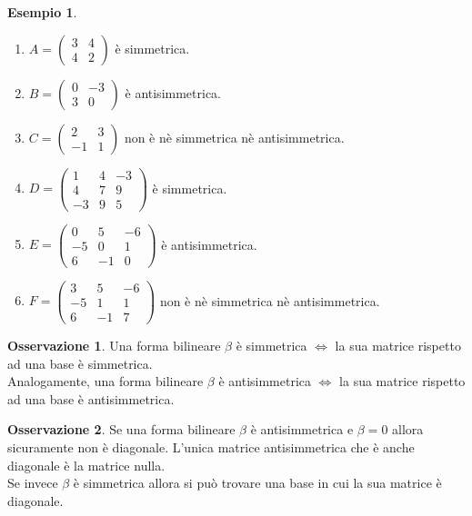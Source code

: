 \documentclass[a4paper]{article}
\theoremstyle{definition}
\newtheorem*{oss}{Osservazione}
\newtheorem*{es}{Esempio}
\begin{document}
	\begin{es}
		\begin{enumerate}
			\item $A = \begin{pmatrix}
				3 & 4 \\
				4 & 2
			\end{pmatrix}$ è simmetrica.
			\item $B = \begin{pmatrix}
				0 & -3 \\
				3 & 0
			\end{pmatrix}$ è antisimmetrica.
			\item $C = \begin{pmatrix}
				2 & 3 \\
				-1 & 1
			\end{pmatrix}$ non è nè simmetrica nè antisimmetrica.
			\item $D = \begin{pmatrix}
				1 & 4 & -3 \\
				4 & 7 & 9 \\
				-3 & 9 & 5
			\end{pmatrix}$ è simmetrica.
			\item $E = \begin{pmatrix}
				0 & 5 & -6 \\
				-5 & 0 & 1 \\
				6 & -1 & 0
			\end{pmatrix}$ è antisimmetrica.
			\item $F = \begin{pmatrix}
				3 & 5 & -6 \\
				-5 & 1 & 1 \\
				6 & -1 & 7
			\end{pmatrix}$ non è nè simmetrica nè antisimmetrica.
		\end{enumerate}
	\end{es}
	\begin{oss}
		Una forma bilineare $\beta$ è simmetrica $\Leftrightarrow$ la sua matrice rispetto ad una base è simmetrica. \\
		Analogamente, una forma bilineare $\beta$ è antisimmetrica $\Leftrightarrow$ la sua matrice rispetto ad una base è antisimmetrica.
	\end{oss}

	\begin{oss}
		Se una forma bilineare $\beta$ è antisimmetrica e $\beta = 0$ allora sicuramente non è diagonale. L'unica matrice antisimmetrica che è anche diagonale è la matrice nulla. \\
		Se invece $\beta$ è simmetrica allora si può trovare una base in cui la sua matrice è diagonale.
	\end{oss}
\end{document}
